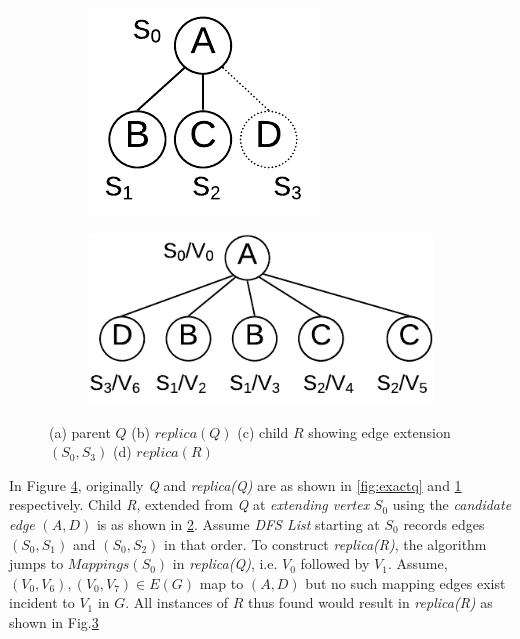\begin{figure}
\begin{subfigure}[b]{0.35\textwidth}
            \vspace{-1.3\baselineskip}
            \caption{}
			\label{fig:exactrepq}
	\end{subfigure}
	\captionsetup[subfigure]{skip=-2pt}
	\begin{subfigure}[b]{0.15\textwidth}
		\includegraphics[scale=0.6]{img_ex/Exact-R.pdf}
		\caption{}
		\label{fig:exactr}
	\end{subfigure}%
	\begin{subfigure}[b]{0.35\textwidth}
		\includegraphics[scale=0.6]{img_ex/Exact-rep(R).pdf}
		\caption{}
		\label{fig:exactrepr}
	\end{subfigure}
    \vspace{0.5\baselineskip}
	\caption{\textup{(a)} parent $Q$ \textup{(b)} $replica(Q)$ \textup{(c)} child $R$ showing edge extension $(S_0, S_3)$ \textup{(d)} $replica(R)$}\label{fig:exactex}
	\vspace{0.75\baselineskip}
\end{figure}

\begin{exple}	
	In Figure \ref{fig:exactex}, originally \emph{Q} and \emph{replica(Q)} are
	as shown in \ref{fig:exactq} and \ref{fig:exactrepq} respectively. Child
	\emph{R}, extended from \emph{Q} at \emph{extending vertex} $S_0$ using the
	\emph{candidate edge} $(A, D)$ is as shown in \ref{fig:exactr}. Assume
	\emph{DFS List} starting at $S_0$ records edges $(S_0, S_1)$ and $(S_0,
	S_2)$ in that order. To construct \emph{replica(R)}, the algorithm jumps to
	$Mappings(S_0)$ in \emph{replica(Q)}, i.e. ${V_0}$ followed by ${V_1}$.
	Assume, $(V_0, V_6), (V_0, V_7)\in E(G)$ map to $(A, D)$ but no such
	mapping edges exist incident to $V_1$ in $G$. All instances of $R$ thus found
	would result in \emph{replica(R)} as shown in Fig.\ref{fig:exactrepr}
\end{exple}

